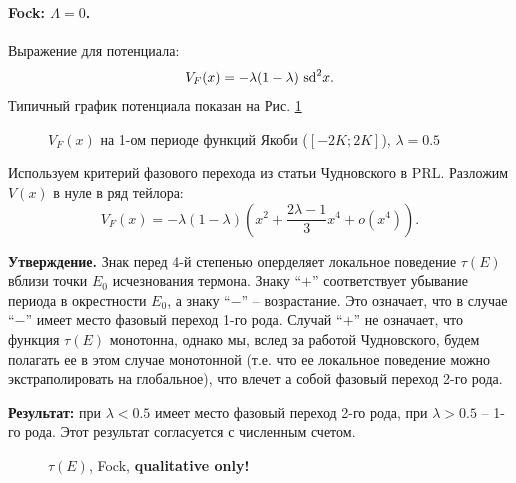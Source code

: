 \documentclass[12pt]{article}
\begin{document}
\paragraph{Fock: $\Lambda = 0$.}
Выражение для потенциала:
%
\begin{equation}
V_F (x) = -\lambda (1 - \lambda)~\textrm{sd}^2 x.
\label{eq:potential_fock}
\end{equation}
%
Типичный график потенциала показан на Рис. \ref{pic:potential_fock}
%
\begin{figure}[Ht!]
\caption{$V_F (x)$ на 1-ом периоде функций Якоби ($[-2K; 2K]$), $\lambda = 0.5$}
\label{pic:potential_fock}
\end{figure}
%
Используем критерий фазового перехода из статьи Чудновского в PRL.
Разложим $V(x)$ в нуле в ряд тейлора:
%
\begin{equation}
V_F (x) = -\lambda (1 - \lambda) \left( x^2 + \frac{2\lambda - 1}{3} x^4 + o(x^4) \right).
\end{equation}
%

\textbf{Утверждение.} Знак перед 4-й степенью оперделяет локальное поведение $\tau(E)$ вблизи точки $E_0$ исчезнования термона.
Знаку ``$+$'' соответствует убывание периода в окрестности $E_0$, а знаку ``$-$'' -- возрастание.
Это означает, что в случае ``$-$'' имеет место фазовый переход 1-го рода.
Случай ``$+$'' не означает, что функция $\tau(E)$ монотонна, однако мы, вслед за работой Чудновского, будем полагать ее в этом случае монотонной (т.е. что ее локальное поведение можно экстраполировать на глобальное), что влечет а собой фазовый переход 2-го рода.

\textbf{Результат:} при $\lambda < 0.5$ имеет место фазовый переход 2-го рода, при $\lambda > 0.5$ -- 1-го рода.
Этот результат согласуется с численным счетом.
%
\begin{figure}[Ht!]
\caption{$\tau(E)$, Fock, {\bf qualitative only!}}
\end{figure}
%
\end{document}
